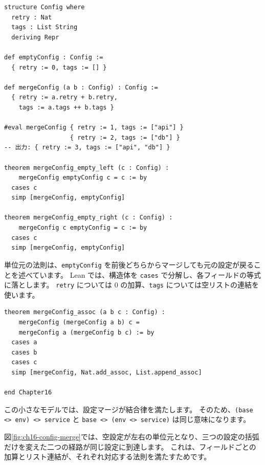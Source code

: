 \begin{listing}[htbp]
\begin{verbatim}
structure Config where
  retry : Nat
  tags : List String
  deriving Repr

def emptyConfig : Config :=
  { retry := 0, tags := [] }

def mergeConfig (a b : Config) : Config :=
  { retry := a.retry + b.retry,
    tags := a.tags ++ b.tags }

#eval mergeConfig { retry := 1, tags := ["api"] }
                  { retry := 2, tags := ["db"] }
-- 出力: { retry := 3, tags := ["api", "db"] }

theorem mergeConfig_empty_left (c : Config) :
    mergeConfig emptyConfig c = c := by
  cases c
  simp [mergeConfig, emptyConfig]

theorem mergeConfig_empty_right (c : Config) :
    mergeConfig c emptyConfig = c := by
  cases c
  simp [mergeConfig, emptyConfig]
\end{verbatim}
\caption{\texttt{Config} と \texttt{mergeConfig}}
\label{lst:ch16_config_merge}
\end{listing}

単位元の法則は、\texttt{emptyConfig} を前後どちらからマージしても元の設定が戻ることを述べています。
Lean では、構造体を \texttt{cases} で分解し、各フィールドの等式に落とします。
\texttt{retry} については \(0\) の加算、\texttt{tags} については空リストの連結を使います。

\begin{listing}[htbp]
\begin{verbatim}
theorem mergeConfig_assoc (a b c : Config) :
    mergeConfig (mergeConfig a b) c =
    mergeConfig a (mergeConfig b c) := by
  cases a
  cases b
  cases c
  simp [mergeConfig, Nat.add_assoc, List.append_assoc]

end Chapter16
\end{verbatim}
\caption{\texttt{mergeConfig\_assoc}}
\label{lst:ch16_config_assoc}
\end{listing}

この小さなモデルでは、設定マージが結合律を満たします。
そのため、\texttt{(base <> env) <> service} と \texttt{base <> (env <> service)} は同じ意味になります。

図\ref{fig:ch16-config-merge}では、空設定が左右の単位元となり、三つの設定の括弧だけを変えた二つの経路が同じ設定に到達します。
これは、フィールドごとの加算とリスト連結が、それぞれ対応する法則を満たすためです。


